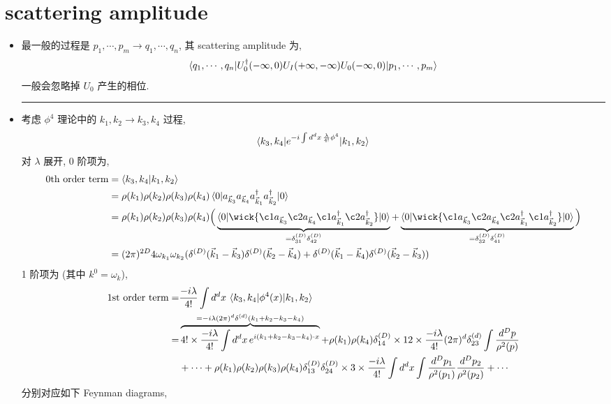 \section{scattering amplitude}
\begin{itemize}
	\item 最一般的过程是 $p_1, \cdots, p_m \rightarrow q_1, \cdots, q_n$, 其 scattering amplitude 为,
	\begin{equation}
		\braket{q_1, \cdots, q_n | U_0^\dag(- \infty, 0) U_I(+ \infty, - \infty) U_0(- \infty, 0) | p_1, \cdots, p_m}
	\end{equation}
	一般会忽略掉 $U_0$ 产生的相位.
	
	\noindent\rule[0.5ex]{\linewidth}{0.5pt} %
	
	\item 考虑 $\phi^4$ 理论中的 $k_1, k_2 \rightarrow k_3, k_4$ 过程,
	\begin{equation}
		\braket{k_3, k_4 | e^{- i \int d^d x \, \frac{\lambda}{4!} \phi^4} | k_1, k_2}
	\end{equation}
	对 $\lambda$ 展开, 0 阶项为,
	\begin{align}
		\text{0th order term} &= \braket{k_3, k_4 | k_1, k_2} \notag \\
		&= \rho(k_1) \rho(k_2) \rho(k_3) \rho(k_4) \braket{0 | a_{\vec{k}_3} a_{\vec{k}_4} a^\dag_{\vec{k}_1} a^\dag_{\vec{k}_2} | 0} \notag \\
		&= \rho(k_1) \rho(k_2) \rho(k_3) \rho(k_4) \Big( \underbrace{\braket{0 | \wick{
			\c1 a_{\vec{k}_3} \c2 a_{\vec{k}_4} \c1 a^\dag_{\vec{k}_1} \c2 a^\dag_{\vec{k}_2}
		} | 0}}_{= \delta^{(D)}_{3 1} \delta^{(D)}_{4 2}} + \underbrace{\braket{0 | \wick{
			\c1 a_{\vec{k}_3} \c2 a_{\vec{k}_4} \c2 a^\dag_{\vec{k}_1} \c1 a^\dag_{\vec{k}_2}
		} | 0}}_{= \delta^{(D)}_{3 2} \delta^{(D)}_{4 1}} \Big) \notag \\
		&= (2 \pi)^{2 D} 4 \omega_{k_1} \omega_{k_2} (\delta^{(D)}(\vec{k}_1 - \vec{k}_3) \delta^{(D)}(\vec{k}_2 - \vec{k}_4) + \delta^{(D)}(\vec{k}_1 - \vec{k}_4) \delta^{(D)}(\vec{k}_2 - \vec{k}_3))
	\end{align}
	1 阶项为 (其中 $k^0 = \omega_k$),
	\begin{align}
		\text{1st order term} =& \frac{- i \lambda}{4!} \int d^d x \, \braket{k_3, k_4 | \phi^4(x) | k_1, k_2} \notag \\
		=& \overbrace{4! \times \frac{- i \lambda}{4!} \int d^d x \, e^{i (k_1 + k_2 - k_3 - k_4) \cdot x}}^{= - i \lambda (2 \pi)^d \delta^{(d)}(k_1 + k_2 - k_3 - k_4)} + \rho(k_1) \rho(k_4) \delta^{(D)}_{1 4} \times 12 \times \frac{- i \lambda}{4!} (2 \pi)^d \delta^{(d)}_{2 3} \int \frac{d^D p}{\rho^2(p)} \notag \\
		& + \cdots + \rho(k_1) \rho(k_2) \rho(k_3) \rho(k_4) \delta^{(D)}_{1 3} \delta^{(D)}_{2 4} \times 3 \times \frac{- i \lambda}{4!} \int d^d x \int \frac{d^D p_1}{\rho^2(p_1)} \frac{d^D p_2}{\rho^2(p_2)} + \cdots
	\end{align}
	分别对应如下 Feynman diagrams,
	

\end{itemize}
